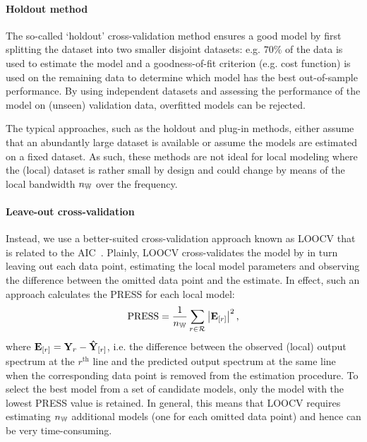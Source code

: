 \paragraph{Holdout method}
The so-called `holdout' cross-validation method ensures a good model by first splitting the dataset into two smaller disjoint datasets: e.g. $70\%$ of the data  is used to estimate the model and a goodness-of-fit criterion (e.g. cost function) is used on the remaining data to determine which model has the best out-of-sample performance.
By using independent datasets and assessing the performance of the model on (unseen) validation data, overfitted models can be rejected.

\begin{remark}
The typical approaches, such as the holdout and plug-in methods, either assume that an abundantly large dataset is available or  assume the models are estimated on a fixed dataset.
As such, these methods are not ideal for local modeling where the (local) dataset is rather small by design and could change by means of the local bandwidth $\nWind$ over the frequency.
\end{remark}

\paragraph{Leave-out cross-validation}
Instead, we use a better-suited cross-validation approach known as \gls{LOOCV} that is related to the \gls{AIC}~\citep{Stone1977}.
Plainly, \gls{LOOCV} cross-validates the model by in turn leaving out each data point, estimating the local model parameters and observing the difference between the omitted data point and the estimate.
In effect, such an approach calculates the \gls{PRESS} for each local model:
\begin{equation}
 \PRESS = 
 \frac{1}{\nWind} 
  \sum_{r \in \LocalShifts{}}
    \abs{\ignoring{r}{\LocalVector{E}}}^2
    \text{,}
\label{eq:PRESS-general}
\end{equation}
where $\ignoring{r}{\LocalVector{E}} = \LocalVector{Y}_{r} - \ignoring{r}{\LocalVector{\estimated{Y}}}$, i.e. the difference between the observed (local) output spectrum at the $r^{\text{th}}$ line and the predicted output spectrum at the same line when the corresponding data point is removed from the estimation procedure.
To select the best model from a set of candidate models, only the model with the lowest \gls{PRESS} value is retained.
In general, this means that \gls{LOOCV} requires estimating $\nWind$ additional models (one for each omitted data point) and hence can be very time-consuming.

